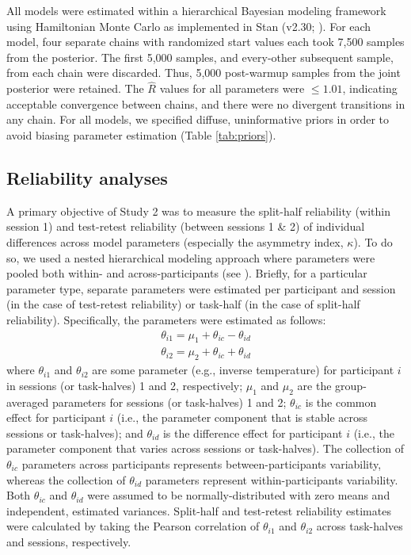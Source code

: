 \documentclass[a4paper,12pt]{article}
\begin{document}
\begin{refsection}[supp]
All models were estimated within a hierarchical Bayesian modeling framework using Hamiltonian Monte Carlo as implemented in Stan (v2.30; \cite{carpenter2017stan}). For each model, four separate chains with randomized start values each took 7,500 samples from the posterior. The first 5,000 samples, and every-other subsequent sample, from each chain were discarded. Thus, 5,000 post-warmup samples from the joint posterior were retained. The $\hat{R}$ values for all parameters were $\leq 1.01$, indicating acceptable convergence between chains, and there were no divergent transitions in any chain. For all models, we specified diffuse, uninformative priors in order to avoid biasing parameter estimation (Table \ref{tab:priors}).

\subsection*{Reliability analyses}

A primary objective of Study 2 was to measure the split-half reliability (within session 1) and test-retest reliability (between sessions 1 \& 2) of individual differences across model parameters (especially the asymmetry index, $\kappa$). To do so, we used a nested hierarchical modeling approach where parameters were pooled both within- and across-participants (see \cite{rouder2019psychometrics}). Briefly, for a particular parameter type, separate parameters were estimated per participant and session (in the case of test-retest reliability) or task-half (in the case of split-half reliability). Specifically, the parameters were estimated as follows:
\begin{equation}
\begin{split}
    \theta_{i1} = \mu_1 + \theta_{ic} - \theta_{id} \\
    \theta_{i2} = \mu_2 + \theta_{ic} + \theta_{id}
\end{split}
\end{equation}
where $\theta_{i1}$ and $\theta_{i2}$ are some parameter (e.g., inverse temperature) for participant $i$ in sessions (or task-halves) 1 and 2, respectively; $\mu_1$ and $\mu_2$ are the group-averaged parameters for sessions (or task-halves) 1 and 2; $\theta_{ic}$ is the common effect for participant $i$ (i.e., the parameter component that is stable across sessions or task-halves); and $\theta_{id}$ is the difference effect for participant $i$ (i.e., the parameter component that varies across sessions or task-halves). The collection of $\theta_{ic}$ parameters across participants represents between-participants variability, whereas the collection of $\theta_{id}$ parameters represent within-participants variability. Both $\theta_{ic}$ and $\theta_{id}$ were assumed to be normally-distributed with zero means and independent, estimated variances. Split-half and test-retest reliability estimates were calculated by taking the Pearson correlation of $\theta_{i1}$ and $\theta_{i2}$ across task-halves and sessions, respectively.


\end{refsection}
\end{document}
